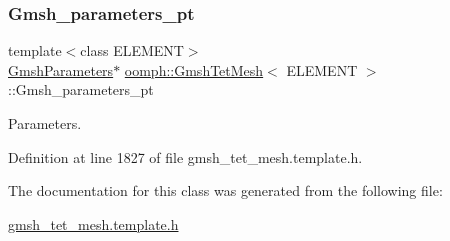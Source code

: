\subsubsection{\texorpdfstring{Gmsh\+\_\+parameters\+\_\+pt}{Gmsh\_parameters\_pt}}
{\footnotesize\ttfamily template$<$class E\+L\+E\+M\+E\+NT$>$ \\
\hyperlink{classoomph_1_1GmshParameters}{Gmsh\+Parameters}$\ast$ \hyperlink{classoomph_1_1GmshTetMesh}{oomph\+::\+Gmsh\+Tet\+Mesh}$<$ E\+L\+E\+M\+E\+NT $>$\+::Gmsh\+\_\+parameters\+\_\+pt\hspace{0.3cm}{\ttfamily [protected]}}



Parameters. 



Definition at line 1827 of file gmsh\+\_\+tet\+\_\+mesh.\+template.\+h.



The documentation for this class was generated from the following file\+:\begin{DoxyCompactItemize}
\item 
\hyperlink{gmsh__tet__mesh_8template_8h}{gmsh\+\_\+tet\+\_\+mesh.\+template.\+h}\end{DoxyCompactItemize}
